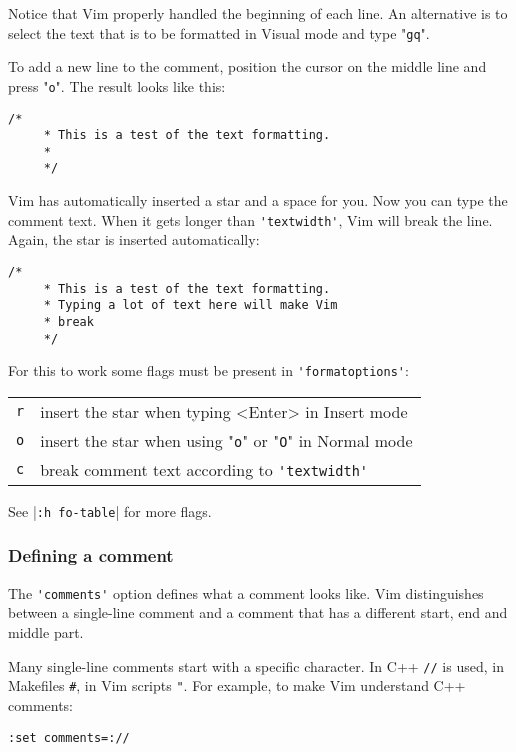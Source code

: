 Notice that Vim properly handled the beginning of each line.
An alternative is to select the text that is to be formatted in Visual mode and type "\verb!gq!".

To add a new line to the comment, position the cursor on the middle line and press "\verb!o!".
The result looks like this:

\begin{Verbatim}[samepage=true]
    /* 
     * This is a test of the text formatting. 
     * 
     */ 
\end{Verbatim}

Vim has automatically inserted a star and a space for you.
Now you can type the comment text.
When it gets longer than \verb!'textwidth'!, Vim will break the line.
Again, the star is inserted automatically:

\begin{Verbatim}[samepage=true]
    /* 
     * This is a test of the text formatting. 
     * Typing a lot of text here will make Vim 
     * break 
     */ 
\end{Verbatim}

For this to work some flags must be present in \verb!'formatoptions'!:

\begin{center} \begin{tabular}{c l}
\verb!r! & insert the star when typing <Enter> in Insert mode \\
\verb!o! & insert the star when using "\verb!o!" or "\verb!O!" in Normal mode \\
\verb!c! & break comment text according to \verb!'textwidth'! \\
\end{tabular} \end{center}

See |\verb!:h fo-table!| for more flags.

\subsubsection{Defining a comment}
The \verb!'comments'! option defines what a comment looks like.
Vim distinguishes between a single-line comment and a comment that has a different start, end and middle part.

Many single-line comments start with a specific character.
In C++ \verb!//! is used, in Makefiles \verb!#!, in Vim scripts \verb!"!.
For example, to make Vim understand C++ comments:

\begin{Verbatim}[samepage=true]
 :set comments=://
\end{Verbatim}

